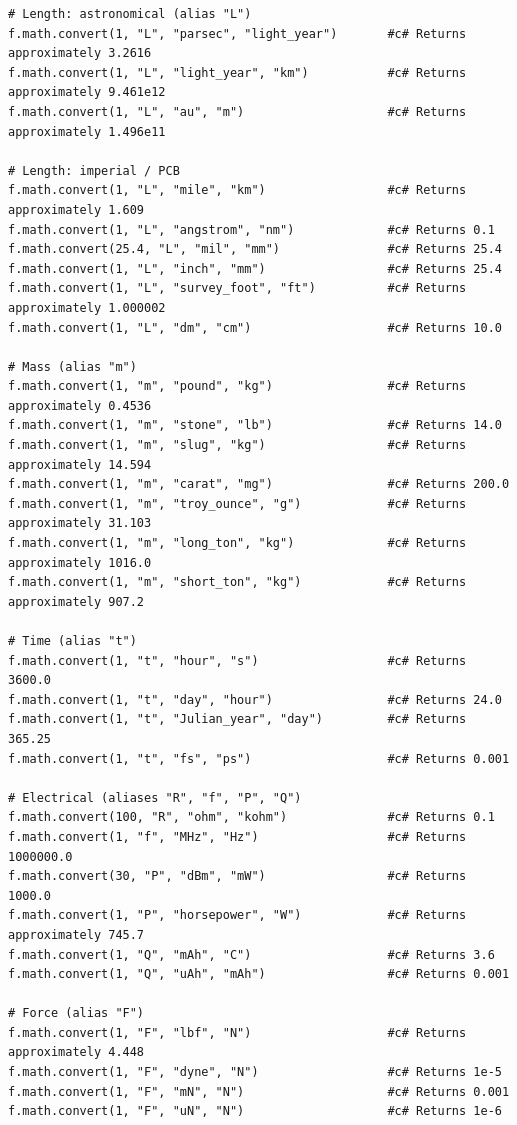 \begin{verbatim}
# Length: astronomical (alias "L")
f.math.convert(1, "L", "parsec", "light_year")       #c# Returns approximately 3.2616
f.math.convert(1, "L", "light_year", "km")           #c# Returns approximately 9.461e12
f.math.convert(1, "L", "au", "m")                    #c# Returns approximately 1.496e11

# Length: imperial / PCB
f.math.convert(1, "L", "mile", "km")                 #c# Returns approximately 1.609
f.math.convert(1, "L", "angstrom", "nm")             #c# Returns 0.1
f.math.convert(25.4, "L", "mil", "mm")               #c# Returns 25.4
f.math.convert(1, "L", "inch", "mm")                 #c# Returns 25.4
f.math.convert(1, "L", "survey_foot", "ft")          #c# Returns approximately 1.000002
f.math.convert(1, "L", "dm", "cm")                   #c# Returns 10.0

# Mass (alias "m")
f.math.convert(1, "m", "pound", "kg")                #c# Returns approximately 0.4536
f.math.convert(1, "m", "stone", "lb")                #c# Returns 14.0
f.math.convert(1, "m", "slug", "kg")                 #c# Returns approximately 14.594
f.math.convert(1, "m", "carat", "mg")                #c# Returns 200.0
f.math.convert(1, "m", "troy_ounce", "g")            #c# Returns approximately 31.103
f.math.convert(1, "m", "long_ton", "kg")             #c# Returns approximately 1016.0
f.math.convert(1, "m", "short_ton", "kg")            #c# Returns approximately 907.2

# Time (alias "t")
f.math.convert(1, "t", "hour", "s")                  #c# Returns 3600.0
f.math.convert(1, "t", "day", "hour")                #c# Returns 24.0
f.math.convert(1, "t", "Julian_year", "day")         #c# Returns 365.25
f.math.convert(1, "t", "fs", "ps")                   #c# Returns 0.001

# Electrical (aliases "R", "f", "P", "Q")
f.math.convert(100, "R", "ohm", "kohm")              #c# Returns 0.1
f.math.convert(1, "f", "MHz", "Hz")                  #c# Returns 1000000.0
f.math.convert(30, "P", "dBm", "mW")                 #c# Returns 1000.0
f.math.convert(1, "P", "horsepower", "W")            #c# Returns approximately 745.7
f.math.convert(1, "Q", "mAh", "C")                   #c# Returns 3.6
f.math.convert(1, "Q", "uAh", "mAh")                 #c# Returns 0.001

# Force (alias "F")
f.math.convert(1, "F", "lbf", "N")                   #c# Returns approximately 4.448
f.math.convert(1, "F", "dyne", "N")                  #c# Returns 1e-5
f.math.convert(1, "F", "mN", "N")                    #c# Returns 0.001
f.math.convert(1, "F", "uN", "N")                    #c# Returns 1e-6


\end{verbatim}
